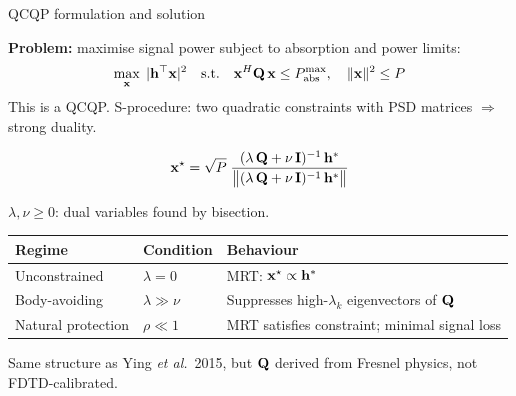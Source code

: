 \begin{frame}[label=app-p3-qcqp]{QCQP formulation and solution}

  {\small \textbf{Problem:} maximise signal power subject to absorption and power limits:}
  \vspace{-2pt}
  \[
    \max_{\mathbf{x}}\; |\mathbf{h}^\top\mathbf{x}|^2
    \quad\text{s.t.}\quad
    \mathbf{x}^H\mathbf{Q}\,\mathbf{x} \le P_{\mathrm{abs}}^{\max},
    \quad \|\mathbf{x}\|^2 \le P
  \]
  \vspace{-2pt}
  {\small This is a QCQP. S-procedure: two quadratic constraints with PSD matrices $\Rightarrow$ strong duality.}
  \begin{resultbox}
    \vspace{-6pt}
    \[
      \mathbf{x}^\star = \sqrt{P}\;
      \frac{(\lambda\,\mathbf{Q} + \nu\,\mathbf{I})^{-1}\,\mathbf{h}^*}
           {\bigl\|(\lambda\,\mathbf{Q} + \nu\,\mathbf{I})^{-1}\,\mathbf{h}^*\bigr\|}
    \]
    \vspace{-6pt}
  \end{resultbox}
  \vspace{-2pt}
  {\footnotesize $\lambda, \nu \ge 0$: dual variables found by bisection.}
  \vspace{0pt}
  {\small
  \begin{tabular}{@{}lll@{}}
    \toprule
    Regime & Condition & Behaviour \\
    \midrule
    Unconstrained & $\lambda = 0$ & MRT: $\mathbf{x}^\star \propto \mathbf{h}^*$ \\
    Body-avoiding & $\lambda \gg \nu$ & Suppresses high-$\lambda_k$ eigenvectors of $\mathbf{Q}$ \\
    Natural protection & $\rho \ll 1$ & MRT satisfies constraint; minimal signal loss \\
    \bottomrule
  \end{tabular}
  }
  \vspace{0pt}
  {\footnotesize Same structure as Ying \textit{et al.}\ 2015, but $\mathbf{Q}$ derived from Fresnel physics, not FDTD-calibrated.}
  \vspace{-2pt}
\end{frame}

